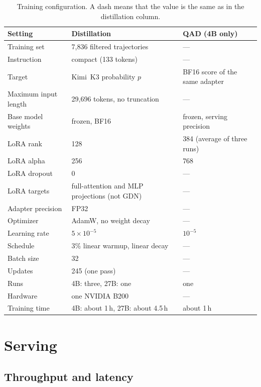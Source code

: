 \begin{table}[h]
\caption{Training configuration. A dash means that the value is the same as in the distillation column.}
\label{tab:training-config}
\centering
\small
\begin{tabular}{@{}lll@{}}
\toprule
Setting & Distillation & QAD (4B only) \\
\midrule
Training set & 7,836 filtered trajectories & --- \\
Instruction & compact (133 tokens) & --- \\
Target & Kimi~K3 probability $p$ & BF16 score of the same adapter \\
Maximum input length & 29,696 tokens, no truncation & --- \\
\addlinespace
Base model weights & frozen, BF16 & frozen, serving precision \\
LoRA rank & 128 & 384 (average of three runs) \\
LoRA alpha & 256 & 768 \\
LoRA dropout & 0 & --- \\
LoRA targets & full-attention and MLP projections (not GDN) & --- \\
Adapter precision & FP32 & --- \\
\addlinespace
Optimizer & AdamW, no weight decay & --- \\
Learning rate & $5 \times 10^{-5}$ & $10^{-5}$ \\
Schedule & 3\% linear warmup, linear decay & --- \\
Batch size & 32 & --- \\
Updates & 245 (one pass) & --- \\
\addlinespace
Runs & 4B: three, 27B: one & one \\
Hardware & one NVIDIA B200 & --- \\
Training time & 4B: about 1\,h, 27B: about 4.5\,h & about 1\,h \\
\bottomrule
\end{tabular}
\end{table}

\section{Serving}
\label{app:serving}

\subsection{Throughput and latency}
\label{app:serving-throughput}

